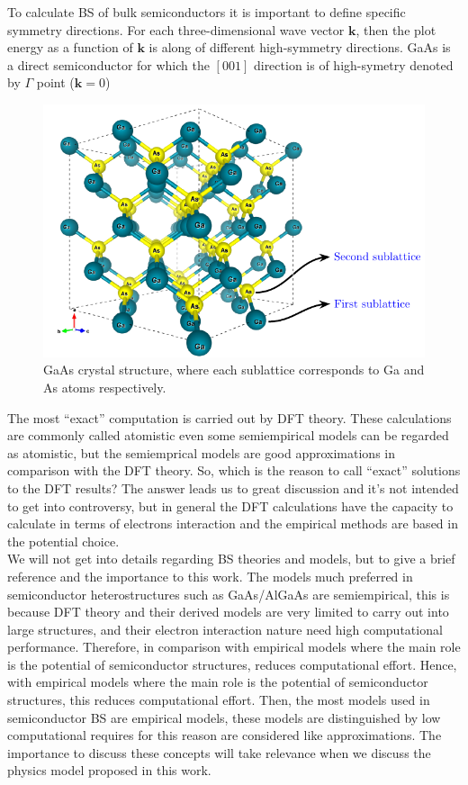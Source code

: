 To calculate \gls{BS} of bulk semiconductors it is important to define specific symmetry directions. For each three-dimensional wave vector $\boldsymbol{k}$, then the plot energy as a function of $\boldsymbol{k}$ is along of different high-symmetry directions\cite{piprek2017handbook}.  GaAs is a direct semiconductor for which the $\left[001\right]$ direction is of high-symetry denoted by $\Gamma$ point ($\boldsymbol{k}=0$)
\begin{figure}[h!]
	\centering
	\includegraphics[width=\linewidth]{../figures/chapter-1/bulk-1/build/bulk-1}
	\caption{
		 GaAs crystal structure, where each sublattice corresponds to Ga and As atoms respectively. }
	\label{fig:subsubsection-1.1.1-bulk-1}
\end{figure}

The most ``exact'' computation is carried out by DFT theory. These calculations are  commonly  called atomistic even some  semiempirical models can be regarded as atomistic, but the semiemprical models are good approximations in comparison with the DFT theory. So, which is the reason to call ``exact'' solutions to the DFT results? The answer leads us to great discussion and  it's not intended to get into controversy,  but in general the DFT calculations have the capacity to calculate in terms of electrons interaction and the empirical methods are based in the potential choice.\\
 
We will not get into details regarding BS theories and models, but to give a brief reference and the importance to this work. The models much preferred in semiconductor heterostructures such as GaAs/AlGaAs are semiempirical, this is because
\gls{DFT} theory and their derived models are very limited to carry out into large structures, and
their electron interaction nature need high computational performance. Therefore, in comparison
with empirical models where the main role is the potential of semiconductor structures,  reduces computational effort. Hence, with empirical models where the main role is the potential of semiconductor structures, this reduces computational effort. Then, the most models used in semiconductor BS are empirical models, these models are distinguished by low computational requires for this reason are considered like approximations. The importance to discuss these concepts will take relevance when we discuss the physics model proposed in this work. 

